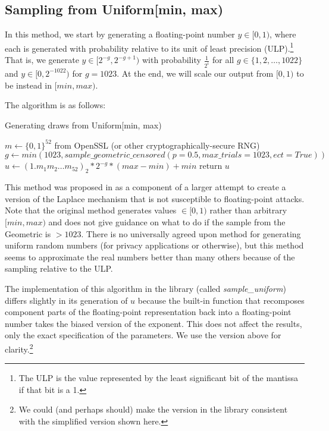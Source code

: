 \documentclass[11pt]{scrartcl} %
\begin{document}
\subsection{Sampling from Uniform[min, max)}
\label{subsec:unif_sampling}
In this method, we start by generating a floating-point number $y \in [0,1)$,
where each is generated with probability relative to its unit of least precision (ULP).\footnote{The ULP is the value
represented by the least significant bit of the mantissa if that bit is a 1.} 
That is, we generate $y \in [2^{-g}, 2^{-g+1})$ with probability $\frac{1}{2^i}$
for all $g \in \{1,2,\hdots,1022\}$ and $y \in [0, 2^{-1022})$ for $g = 1023$.
At the end, we will scale our output from $[0,1)$ to be instead in $[min, max)$. \newline 

The algorithm is as follows:
\begin{algorithm}[H]
	\caption{Generating draws from Uniform[min, max)}
	\label{alg:unif_min_max}
	\begin{algorithmic}[1]
		\State $m \gets \{0, 1\}^{52}$ from OpenSSL (or other cryptographically-secure RNG)
		\State $g \gets min(1023, sample\_geometric\_censored(p = 0.5, max\_trials = 1023, ect = True))$
		\State $u \gets (1.m_1m_2 \hdots m_{52})_2 * 2^{-g} * (max - min) + min$
		\State return $u$
	\end{algorithmic}
\end{algorithm}

This method was proposed in \cite{Mir12} as a component of a larger attempt to create
a version of the Laplace mechanism that is not susceptible to floating-point attacks.
Note that the original method generates values $\in [0,1)$ rather than arbitrary $[min, max)$ 
and does not give guidance on what to do if the sample from the Geometric is $> 1023$.
There is no universally agreed upon method for generating uniform random numbers (for privacy
applications or otherwise), but this method seems to approximate the real numbers better than many
others because of the sampling relative to the ULP. \newline

The implementation of this algorithm in the library (called \emph{sample\_uniform}) differs slightly in its generation of $u$ because 
the built-in function that recomposes component parts of the floating-point representation back into a floating-point number 
takes the biased version of the exponent. This does not affect the results, only the exact specification of the parameters. 
We use the version above for clarity.\footnote{We could (and perhaps should) make the version in the library consistent with the simplified version 
shown here.} \newline
\end{document}
